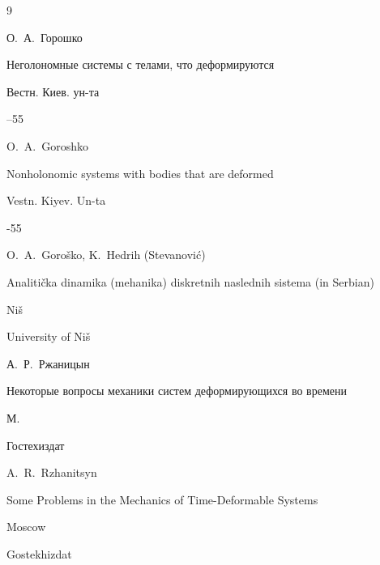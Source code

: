 \begin{thebibliography}{9}




\by О.~А.~Горошко

\paper Неголономные системы с телами, что деформируются

\jour Вестн. Киев. ун-та



--55

\misctransl

\by O.~A.~Goroshko

\paper Nonholonomic systems with bodies that are deformed

\jour Vestn. Kiyev. Un-ta



-55




\by O.~A.~Goro\v{s}ko, K.~Hedrih (Stevanovi\'c)

\book Analiti\v{c}ka dinamika (mehanika) diskretnih naslednih sistema (in Serbian)

\publaddr Ni\v{s}

\publ University of Ni\v{s}








\by А.~Р.~Ржаницын

\book Некоторые вопросы механики систем деформирующихся во времени

\publaddr М.

\publ Гостехиздат



\misctransl

\by A.~R.~Rzhanitsyn


\book Some Problems in the Mechanics of Time-Deformable Systems 

\publaddr Moscow

\publ Gostekhizdat










\end{thebibliography}
